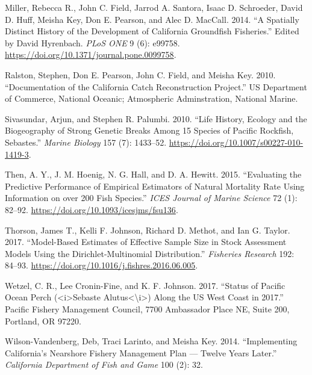 \documentclass[11pt,
  english,
  a4paper,
]{article}
\begin{document}
\begin{cslreferences}
\leavevmode\hypertarget{ref-miller_spatially_2014}{}%
Miller, Rebecca R., John C. Field, Jarrod A. Santora, Isaac D. Schroeder, David D. Huff, Meisha Key, Don E. Pearson, and Alec D. MacCall. 2014. ``A Spatially Distinct History of the Development of California Groundfish Fisheries.'' Edited by David Hyrenbach. \emph{PLoS ONE} 9 (6): e99758. \url{https://doi.org/10.1371/journal.pone.0099758}.

\leavevmode\hypertarget{ref-ralston_documentation_2010}{}%
Ralston, Stephen, Don E. Pearson, John C. Field, and Meisha Key. 2010. ``Documentation of the California Catch Reconstruction Project.'' US Department of Commerce, National Oceanic; Atmospheric Adminstration, National Marine.

\leavevmode\hypertarget{ref-sivasundar_life_2010}{}%
Sivasundar, Arjun, and Stephen R. Palumbi. 2010. ``Life History, Ecology and the Biogeography of Strong Genetic Breaks Among 15 Species of Pacific Rockfish, Sebastes.'' \emph{Marine Biology} 157 (7): 1433--52. \url{https://doi.org/10.1007/s00227-010-1419-3}.

\leavevmode\hypertarget{ref-then_evaluating_2015}{}%
Then, A. Y., J. M. Hoenig, N. G. Hall, and D. A. Hewitt. 2015. ``Evaluating the Predictive Performance of Empirical Estimators of Natural Mortality Rate Using Information on over 200 Fish Species.'' \emph{ICES Journal of Marine Science} 72 (1): 82--92. \url{https://doi.org/10.1093/icesjms/fsu136}.

\leavevmode\hypertarget{ref-thorson_model-based_2017}{}%
Thorson, James T., Kelli F. Johnson, Richard D. Methot, and Ian G. Taylor. 2017. ``Model-Based Estimates of Effective Sample Size in Stock Assessment Models Using the Dirichlet-Multinomial Distribution.'' \emph{Fisheries Research} 192: 84--93. \url{https://doi.org/10.1016/j.fishres.2016.06.005}.

\leavevmode\hypertarget{ref-wetzel_status_2017}{}%
Wetzel, C. R., Lee Cronin-Fine, and K. F. Johnson. 2017. ``Status of Pacific Ocean Perch (\textless i\textgreater Sebaste Alutus\textless\textbackslash i\textgreater) Along the US West Coast in 2017.'' Pacific Fishery Management Council, 7700 Ambassador Place NE, Suite 200, Portland, OR 97220.

\leavevmode\hypertarget{ref-wilson-vandenberg_implementing_2014}{}%
Wilson-Vandenberg, Deb, Traci Larinto, and Meisha Key. 2014. ``Implementing California's Nearshore Fishery Management Plan --- Twelve Years Later.'' \emph{California Department of Fish and Game} 100 (2): 32.
\end{cslreferences}
\end{document}
